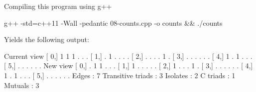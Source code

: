 Compiling this program using g++


\begin{DoxyCode}
g++ -std=c++11 -Wall -pedantic 08-counts.cpp -o counts && ./counts
\end{DoxyCode}


Yields the following output\+:


\begin{DoxyCode}
Current view
[  0,]  1  1  1  .  .  . 
[  1,]  .  1  .  .  .  . 
[  2,]  .  .  .  .  1  . 
[  3,]  .  .  .  .  .  . 
[  4,]  1  .  1  .  .  . 
[  5,]  .  .  .  .  .  . 
New view
[  0,]  .  1  1  .  .  . 
[  1,]  1  .  .  .  .  . 
[  2,]  1  .  .  .  1  . 
[  3,]  .  .  .  .  .  . 
[  4,]  1  .  1  .  .  . 
[  5,]  .  .  .  .  .  . 
Edges             : 7
Transitive triads : 3
Isolates          : 2
C triads          : 1
Mutuals           : 3
\end{DoxyCode}
 